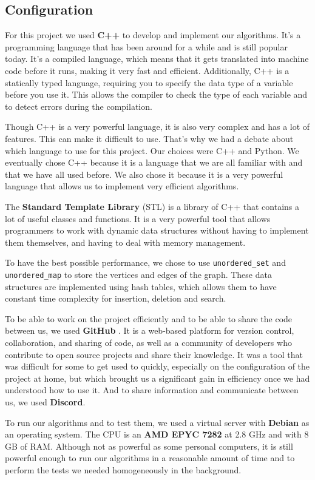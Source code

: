 \subsection{Configuration}

For this project we used \textbf{C++} to develop and implement our algorithms. 
It's a programming language that has been around for a while and is still popular today. 
It's a compiled language, which means that it gets translated into machine code before it runs, making it very fast and efficient. 
Additionally, C++ is a statically typed language, requiring you to specify the data type of a variable before you use it. 
This allows the compiler 
to check the type of each variable and to detect errors during the compilation. \bigskip

Though C++ is a very powerful language, it is also very complex and has a lot of
features. This can make it difficult to use. That's why we had a debate about
which language to use for this project. Our choices were C++ and Python. We
eventually chose C++ because it is a language that we are all familiar with and
that we have all used before. We also chose it because it is a very powerful
language that allows us to implement very efficient algorithms. \bigskip

The \textbf{Standard Template Library} (STL) is a library of C++ that contains 
a lot of useful classes and functions. It is a very powerful tool that allows 
programmers to work with dynamic data structures without having to implement 
them themselves, and having to deal with memory management. \bigskip

To have the best possible performance, we chose to use \texttt{unordered\_set}
and \texttt{unordered\_map} to store the vertices and edges of the graph. These
data structures are implemented using hash tables, which allows them to have
constant time complexity for insertion, deletion and search. \bigskip

To be able to work on the project efficiently and to be able to share the code
between us, we used \textbf{GitHub}\footnotemark 
{}.
It is a web-based platform for version control, collaboration, and sharing of
code, as well as a community of developers who contribute to open source projects
and share their knowledge. It was a tool that was difficult for some to get used
to quickly, especially on the configuration of the project at home, but which
brought us a significant gain in efficiency once we had understood how to use it.
And to share information and communicate between us, we used \textbf{Discord}.
\bigskip

To run our algorithms and to test them, we used a virtual server with \textbf{Debian}
as an operating system. The CPU is an \textbf{AMD EPYC 7282} at 2.8 GHz and with
8 GB of RAM. Although not as powerful as some personal computers, it is still
powerful enough to run our algorithms in a reasonable amount of time and to
perform the tests we needed homogeneously in the background.